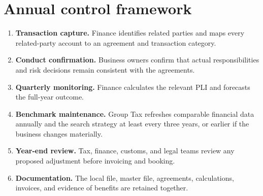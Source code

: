 \section{Annual control framework}
\begin{enumerate}
  \item \textbf{Transaction capture.} Finance identifies related parties and
    maps every related-party account to an agreement and transaction category.
  \item \textbf{Conduct confirmation.} Business owners confirm that actual
    responsibilities and risk decisions remain consistent with the agreements.
  \item \textbf{Quarterly monitoring.} Finance calculates the relevant PLI and
    forecasts the full-year outcome.
  \item \textbf{Benchmark maintenance.} Group Tax refreshes comparable financial
    data annually and the search strategy at least every three years, or earlier
    if the business changes materially.
  \item \textbf{Year-end review.} Tax, finance, customs, and legal teams review
    any proposed adjustment before invoicing and booking.
  \item \textbf{Documentation.} The local file, master file, agreements,
    calculations, invoices, and evidence of benefits are retained together.
\end{enumerate}
